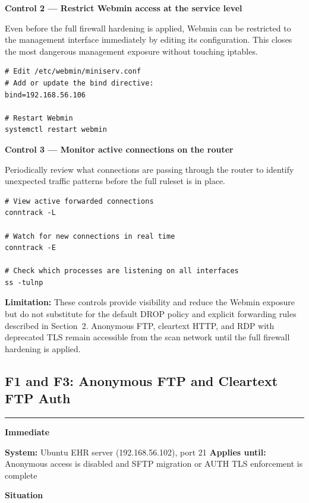 \documentclass[12pt]{article}
\newcommand{\tfbadge}[2]{%
  \colorbox{#1}{\color{white}\textbf{\small #2}}%
}
\newcommand{\sectionrule}{%
  \vspace{4pt}\noindent\textcolor{headercol}{\rule{\linewidth}{0.8pt}}\vspace{4pt}%
}
\begin{document}
\bigskip
\noindent\textbf{Control 2 --- Restrict Webmin access at the service level}
 
Even before the full firewall hardening is applied, Webmin can be restricted
to the management interface immediately by editing its configuration. This
closes the most dangerous management exposure without touching iptables.
 
\begin{lstlisting}[style=terminal]
# Edit /etc/webmin/miniserv.conf
# Add or update the bind directive:
bind=192.168.56.106
 
# Restart Webmin
systemctl restart webmin
\end{lstlisting}
 
\bigskip
\noindent\textbf{Control 3 --- Monitor active connections on the router}
 
Periodically review what connections are passing through the router to
identify unexpected traffic patterns before the full ruleset is in place.
 
\begin{lstlisting}[style=terminal]
# View active forwarded connections
conntrack -L
 
# Watch for new connections in real time
conntrack -E
 
# Check which processes are listening on all interfaces
ss -tulnp
\end{lstlisting}
 
\begin{impactbox}
\textbf{Limitation:} These controls provide visibility and reduce the Webmin
exposure but do not substitute for the default DROP policy and explicit
forwarding rules described in Section~2. Anonymous FTP, cleartext HTTP, and
RDP with deprecated TLS remain accessible from the scan network until the
full firewall hardening is applied.
\end{impactbox}
 
\subsection{F1 and F3: Anonymous FTP and Cleartext FTP Auth}
\sectionrule
 
\noindent\tfbadge{immediatecol}{Immediate}
\quad\textbf{System:} Ubuntu EHR server (192.168.56.102), port 21
\quad\textbf{Applies until:} Anonymous access is disabled and SFTP migration
or AUTH TLS enforcement is complete
 
\bigskip
\noindent\textbf{Situation}
 
\end{document}
